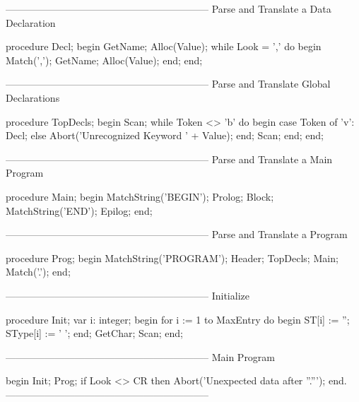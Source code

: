 \documentclass[float=false, crop=false]{standalone}
\begin{document}
\begin{code}
{--------------------------------------------------------------}
{ Parse and Translate a Data Declaration }

procedure Decl;
begin
   GetName;
   Alloc(Value);
   while Look = ',' do begin
      Match(',');
      GetName;
      Alloc(Value);
   end;
end;


{--------------------------------------------------------------}
{ Parse and Translate Global Declarations }

procedure TopDecls;
begin
   Scan;
   while Token <> 'b' do begin
      case Token of
        'v': Decl;
      else Abort('Unrecognized Keyword ' + Value);
      end;
      Scan;
   end;
end;


{--------------------------------------------------------------}
{ Parse and Translate a Main Program }

procedure Main;
begin
   MatchString('BEGIN');
   Prolog;
   Block;
   MatchString('END');
   Epilog;
end;


{--------------------------------------------------------------}
{  Parse and Translate a Program }

procedure Prog;
begin
   MatchString('PROGRAM');
   Header;
   TopDecls;
   Main;
   Match('.');
end;


{--------------------------------------------------------------}
{ Initialize }

procedure Init;
var i: integer;
begin
   for i := 1 to MaxEntry do begin
      ST[i] := '';
      SType[i] := ' ';
   end;
   GetChar;
   Scan;
end;


{--------------------------------------------------------------}
{ Main Program }

begin
   Init;
   Prog;
   if Look <> CR then Abort('Unexpected data after ''.''');
end.
{--------------------------------------------------------------}
\end{code}
\end{document}
